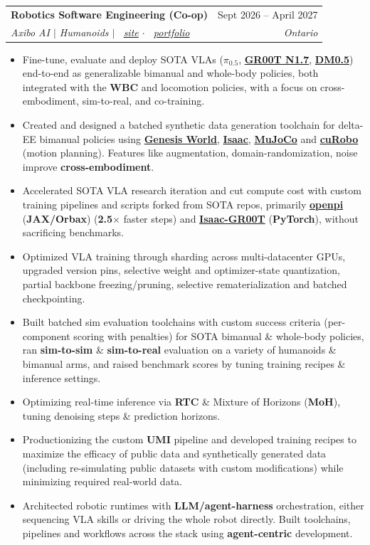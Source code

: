 \documentclass[letterpaper,10pt]{article}
\makeatletter
\newcommand{\stlink}[1]{{\color{uwpurple}\faGlobe\ \href{#1}{site}}}
\newcommand{\pflink}[1]{{\color{uwpurple}\faIcon{external-link-alt}\ \href{#1}{portfolio}}}
\newcommand{\resumeItem}[1]{
  \item\small{#1}\vspace{-2pt}
}
\newcommand{\resumeSubheading}[4]{
  \vspace{-2pt}\item
    \begin{tabular*}{\textwidth}[t]{l@{\extracolsep{\fill}}r}
      \textbf{#1} & #2 \\
      \textit{\small#3} & \textit{\small #4} \\
    \end{tabular*}\vspace{-7pt}
}
\newcommand{\resumeItemListStart}{\begin{itemize}}
\newcommand{\resumeItemListEnd}{\end{itemize}\vspace{-5pt}}
\makeatother
\begin{document}
    \resumeSubheading
      {Robotics Software Engineering (Co-op)}{Sept 2026 -- April 2027}
      {Axibo AI $|$ Humanoids $|$ \stlink{https://www.axibo.com/} $\cdot$ \pflink{https://bjahoor.github.io/projects/axibo-physical-ai}}{Ontario}
      \resumeItemListStart
        \resumeItem{Fine-tune, evaluate and deploy SOTA VLAs (\href{https://www.physicalintelligence.company/blog/pi05}{\textbf{\boldmath$\pi_{0.5}$}}, \href{https://developer.nvidia.com/isaac/gr00t}{\textbf{GR00T N1.7}}, \href{https://www.dexmal.com/models/dm0.5}{\textbf{DM0.5}}) end-to-end as generalizable bimanual and whole-body policies, both integrated with the \textbf{WBC} and locomotion policies, with a focus on cross-embodiment, sim-to-real, and co-training.}
        \resumeItem{Created and designed a batched synthetic data generation toolchain for delta-EE bimanual policies using \href{https://genesis-world.readthedocs.io/en/latest/}{\textbf{Genesis World}}, \href{https://developer.nvidia.com/isaac/sim}{\textbf{Isaac}}, \href{https://mujoco.org/}{\textbf{MuJoCo}} and \href{https://curobo.org/}{\textbf{cuRobo}} (motion planning). Features like augmentation, domain-randomization, noise improve \textbf{cross-embodiment}.}
        \resumeItem{Accelerated SOTA VLA research iteration and cut compute cost with custom training pipelines and scripts forked from SOTA repos, primarily \href{https://github.com/Physical-Intelligence/openpi}{\textbf{openpi}} (\textbf{JAX/Orbax}) (\textbf{2.5$\times$} faster steps) and \href{https://github.com/NVIDIA/Isaac-GR00T}{\textbf{Isaac-GR00T}} (\textbf{PyTorch}), without sacrificing benchmarks.}
        \resumeItem{Optimized VLA training through sharding across multi-datacenter GPUs, upgraded version pins, selective weight and optimizer-state quantization, partial backbone freezing/pruning, selective rematerialization and batched checkpointing.}
        \resumeItem{Built batched sim evaluation toolchains with custom success criteria (per-component scoring with penalties) for SOTA bimanual \& whole-body policies, ran \textbf{sim-to-sim} \& \textbf{sim-to-real} evaluation on a variety of humanoids \& bimanual arms, and raised benchmark scores by tuning training recipes \& inference settings.}
        \resumeItem{Optimizing real-time inference via \textbf{RTC} \& Mixture of Horizons (\textbf{MoH}), tuning denoising steps \& prediction horizons.}
        \resumeItem{Productionizing the custom \textbf{UMI} pipeline and developed training recipes to maximize the efficacy of public data and synthetically generated data (including re-simulating public datasets with custom modifications) while minimizing required real-world data.}
        \resumeItem{Architected robotic runtimes with \textbf{LLM/agent-harness} orchestration, either sequencing VLA skills or driving the whole robot directly. Built toolchains, pipelines and workflows across the stack using \textbf{agent-centric} development.}
      \resumeItemListEnd
\end{document}
